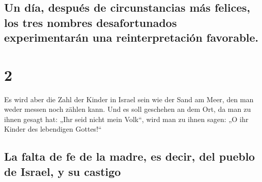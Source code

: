 \hypertarget{un-duxeda-despuuxe9s-de-circunstancias-muxe1s-felices-los-tres-nombres-desafortunados-experimentaruxe1n-una-reinterpretaciuxf3n-favorable.}{%
\subsection{Un día, después de circunstancias más felices, los tres
nombres desafortunados experimentarán una reinterpretación
favorable.}\label{un-duxeda-despuuxe9s-de-circunstancias-muxe1s-felices-los-tres-nombres-desafortunados-experimentaruxe1n-una-reinterpretaciuxf3n-favorable.}}

\hypertarget{section-1}{%
\section{2}\label{section-1}}

 Es wird aber die Zahl der Kinder in Israel sein wie der
Sand am Meer, den man weder messen noch zählen kann. Und es soll
geschehen an dem Ort, da man zu ihnen gesagt hat: „Ihr seid nicht mein
Volk``, wird man zu ihnen sagen: „O ihr Kinder des lebendigen
Gottes!{}``

\hypertarget{la-falta-de-fe-de-la-madre-es-decir-del-pueblo-de-israel-y-su-castigo}{%
\subsection{La falta de fe de la madre, es decir, del pueblo de Israel,
y su
castigo}\label{la-falta-de-fe-de-la-madre-es-decir-del-pueblo-de-israel-y-su-castigo}}

